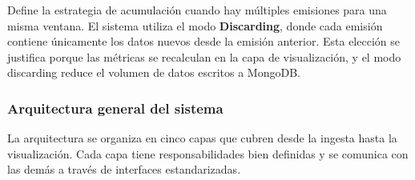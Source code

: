 \documentclass[12pt,a4paper]{article}
\begin{document}
Define la estrategia de acumulación cuando hay múltiples emisiones para una misma ventana. El sistema utiliza el modo \textbf{Discarding}, donde cada emisión contiene únicamente los datos nuevos desde la emisión anterior. Esta elección se justifica porque las métricas se recalculan en la capa de visualización, y el modo discarding reduce el volumen de datos escritos a MongoDB.

\subsubsection{Arquitectura general del sistema}\label{arquitectura-general-del-sistema}
La arquitectura se organiza en cinco capas que cubren desde la ingesta hasta la visualización. Cada capa tiene responsabilidades bien definidas y se comunica con las demás a través de interfaces estandarizadas.
\end{document}
